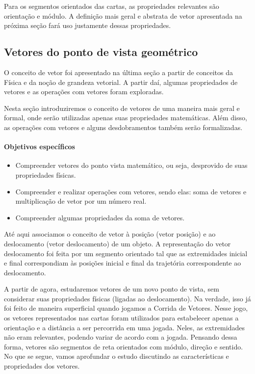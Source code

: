 Para os segmentos orientados das cartas, as propriedades relevantes são orientação e módulo. A definição mais geral e abstrata de vetor apresentada na próxima seção fará uso justamente dessas propriedades.


\label{\detokenize{GE101-0B:organizando-as-ideias-vetores-do-ponto-de-vista-geometrico}}
\label{\detokenize{GE101-0B::doc}}

\begin{texto}
{
\subsection{Vetores do ponto de vista geométrico}
O conceito de vetor foi apresentado na última seção a partir de conceitos da Física e da noção de grandeza vetorial. A partir daí, algumas propriedades de vetores e as operações com vetores foram exploradas.

Nesta seção introduziremos o conceito de vetores de uma maneira mais geral e formal, onde serão utilizadas apenas suas propriedades matemáticas. Além disso, as operações com vetores e alguns desdobramentos também serão formalizadas.

\paragraph{Objetivos específicos}
\begin{itemize}
\item {} 
Compreender vetores do ponto vista matemático, ou seja, desprovido de suas propriedades físicas.

\item {} 
Compreender e realizar operações com vetores, sendo elas: soma de vetores e multiplicação de vetor por um número real.

\item {} 
Compreender algumas propriedades da soma de vetores.

\end{itemize}
}
\end{texto}

Até aqui associamos o conceito de vetor à posição (vetor posição) e ao deslocamento (vetor deslocamento) de um objeto. A representação do vetor deslocamento foi feita por um segmento orientado tal que as extremidades inicial e final correspondiam às posições inicial e final da trajetória correspondente ao deslocamento.

A partir de agora, estudaremos vetores de um novo ponto de vista, sem considerar suas propriedades físicas (ligadas ao deslocamento). Na verdade, isso já foi feito de maneira superficial quando jogamos a Corrida de Vetores. Nesse jogo, os vetores representados nas cartas foram utilizados para estabelecer apenas a orientação e a distância a ser percorrida em uma jogada. Neles, as extremidades não eram relevantes, podendo variar de acordo com a jogada. Pensando dessa forma, vetores são segmentos de reta orientados com módulo, direção e sentido. No que se segue, vamos aprofundar o estudo discutindo as características e propriedades dos vetores.

